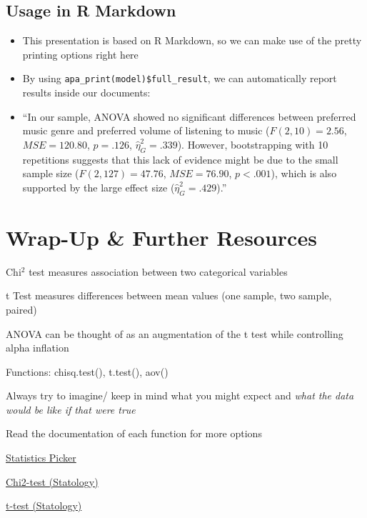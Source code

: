 \documentclass[
]{book}
\begin{document}
\subsection{Usage in R Markdown}\label{usage-in-r-markdown}

\begin{itemize}
\item
  This presentation is based on R Markdown, so we can make use of the pretty printing options right here
\item
  By using \texttt{apa\_print(model)\$full\_result}, we can automatically report results inside our documents:
\item
  ``In our sample, ANOVA showed no significant differences between preferred music genre and preferred volume of listening to music (\(F(2, 10) = 2.56\), \(\mathit{MSE} = 120.80\), \(p = .126\), \(\hat{\eta}^2_G = .339\)). However, bootstrapping with 10 repetitions suggests that this lack of evidence might be due to the small sample size (\(F(2, 127) = 47.76\), \(\mathit{MSE} = 76.90\), \(p < .001\)), which is also supported by the large effect size (\(\hat{\eta}^2_G = .429\)).''
\end{itemize}

\section*{Wrap-Up \& Further Resources}\label{wrap-up-further-resources-6}

Chi\(^2\) test measures association between two categorical variables

t Test measures differences between mean values (one sample, two sample, paired)

ANOVA can be thought of as an augmentation of the t test while controlling alpha inflation

Functions: chisq.test(), t.test(), aov()

Always try to imagine/ keep in mind what you might expect and \emph{what the data would be like if that were true}

Read the documentation of each function for more options

\href{https://the-tave.shinyapps.io/Statistik-Picker/}{Statistics Picker}

\href{https://www.statology.org/chi-square-test-of-independence-in-r/}{Chi2-test (Statology)}

\href{https://www.statology.org/two-sample-t-test/}{t-test (Statology)}
\end{document}
